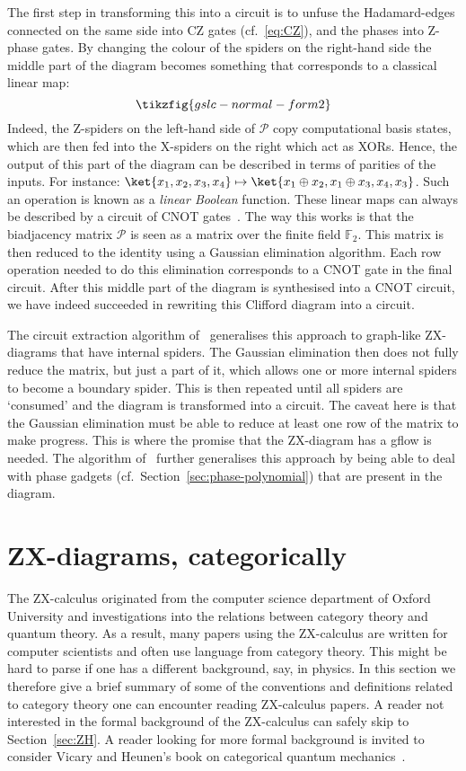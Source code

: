 \documentclass[a4paper,onecolumn,superscriptaddress,11pt,%
				unpublished,%
				allowfontchageintitle,%
				]{quantumarticle}
\begin{document}
The first step in transforming this into a circuit is to unfuse the Hadamard-edges connected on the same side into CZ gates (cf.~\eqref{eq:CZ}), and the phases into Z-phase gates. By changing the colour of the spiders on the right-hand side the middle part of the diagram becomes something that corresponds to a classical linear map:
\begin{equation}
	\tikzfig{gslc-normal-form2}
\end{equation}
Indeed, the Z-spiders on the left-hand side of $\mathcal P$ copy computational basis states, which are then fed into the X-spiders on the right which act as XORs. Hence, the output of this part of the diagram can be described in terms of parities of the inputs. For instance: $\ket{x_1, x_2, x_3, x_4} \mapsto \ket{x_1 \oplus x_2, x_1 \oplus x_3, x_4, x_3}$. Such an operation is known as a \emph{linear Boolean} function. These linear maps can always be described by a circuit of CNOT gates~\cite{markov2008optimal}. The way this works is that the biadjacency matrix $\mathcal P$ is seen as a matrix over the finite field $\mathbb F_2$. This matrix is then reduced to the identity using a Gaussian elimination algorithm. Each row operation needed to do this elimination corresponds to a CNOT gate in the final circuit. After this middle part of the diagram is synthesised into a CNOT circuit, we have indeed succeeded in rewriting this Clifford diagram into a circuit.

The circuit extraction algorithm of~\cite{cliffsimp} generalises this approach to graph-like ZX-diagrams that have internal spiders. The Gaussian elimination then does not fully reduce the matrix, but just a part of it, which allows one or more internal spiders to become a boundary spider. This is then repeated until all spiders are `consumed' and the diagram is transformed into a circuit. 
The caveat here is that the Gaussian elimination must be able to reduce at least one row of the matrix to make progress. This is where the promise that the ZX-diagram has a gflow is needed. 
The algorithm of~\cite{wetering-gflow} further generalises this approach by being able to deal with phase gadgets (cf.~Section~\ref{sec:phase-polynomial}) that are present in the diagram.


\section{ZX-diagrams, categorically}\label{sec:zx-category}
The ZX-calculus originated from the computer science department of Oxford University and investigations into the relations between category theory and quantum theory. As a result, many papers using the ZX-calculus are written for computer scientists and often use language from category theory. 
This might be hard to parse if one has a different background, say, in physics.
In this section we therefore give a brief summary of some of the conventions and definitions related to category theory one can encounter reading ZX-calculus papers.
A reader not interested in the formal background of the ZX-calculus can safely skip to Section~\ref{sec:ZH}. 
A reader looking for more formal background is invited to consider Vicary and Heunen's book on categorical quantum mechanics~\cite{heunen2019categories}.
\end{document}
